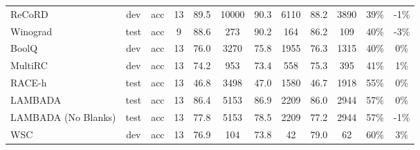 \begin{table}
{\begin{adjustwidth}{-1.4in}{-1.4in}
\begin{center}
\begin{tabular}{lccccccccccc}
              ReCoRD &   dev &      acc &  13 &        89.5 &                     10000 &                            90.3 &                      6110 &                            88.2 &                      3890 &                            39\% &                                                -1\% \\
            Winograd &  test &      acc &   9 &        88.6 &                       273 &                            90.2 &                       164 &                            86.2 &                       109 &                            40\% &                                                -3\% \\
               BoolQ &   dev &      acc &  13 &        76.0 &                      3270 &                            75.8 &                      1955 &                            76.3 &                      1315 &                            40\% &                                                 0\% \\
             MultiRC &   dev &      acc &  13 &        74.2 &                       953 &                            73.4 &                       558 &                            75.3 &                       395 &                            41\% &                                                 1\% \\
              RACE-h &  test &      acc &  13 &        46.8 &                      3498 &                            47.0 &                      1580 &                            46.7 &                      1918 &                            55\% &                                                 0\% \\
             LAMBADA &  test &      acc &  13 &        86.4 &                      5153 &                            86.9 &                      2209 &                            86.0 &                      2944 &                            57\% &                                                 0\% \\
 LAMBADA (No Blanks) &  test &      acc &  13 &        77.8 &                      5153 &                            78.5 &                      2209 &                            77.2 &                      2944 &                            57\% &                                                -1\% \\
                 WSC &   dev &      acc &  13 &        76.9 &                       104 &                            73.8 &                        42 &                            79.0 &                        62 &                            60\% &                                                 3\% \\

\end{tabular}
\end{center}
\end{adjustwidth}}
\end{table}
